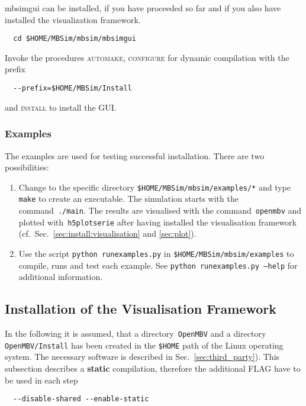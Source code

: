 mbsimgui can be installed, if you have proceeded so far and if you also have installed the visualization framework.
\begin{verbatim}
  cd $HOME/MBSim/mbsim/mbsimgui
\end{verbatim}
Invoke the procedures \textsc{automake, configure} for dynamic compilation with the prefix
\begin{verbatim}
  --prefix=$HOME/MBSim/Install
\end{verbatim}
and \textsc{install} to install the GUI.

\subsubsection{\MBSim Examples}
The examples are used for testing successful installation. There are two possibilities:
\begin{enumerate}
\item Change to the specific directory \texttt{\$HOME/MBSim/mbsim/examples/*} and type \texttt{make} to create an executable. The simulation starts with the command~\texttt{./main}. The results are visualised with the command~\texttt{openmbv} and plotted with~\texttt{h5plotserie} after having installed the visualisation framework (cf.~Sec.~\ref{sec:install:visualisation} and \ref{sec:plot}).
\item Use the script \texttt{python runexamples.py} in \texttt{\$HOME/MBSim/mbsim/examples} to compile, runs and test each example. See \texttt{python runexamples.py --help} for additional information.
\end{enumerate}

\subsection{Installation of the Visualisation Framework\label{sec:install:visualisation}}
In the following it is assumed, that a directory~\texttt{OpenMBV} and a directory \texttt{OpenMBV/Install} has been created in the \texttt{\$HOME} path of the Linux operating system. The necessary software is described in Sec.~\ref{sec:third_party}). This subsection describes a \textbf{static} compilation, therefore the additional FLAG have to be used in each step
\begin{verbatim}
  --disable-shared --enable-static
\end{verbatim}

